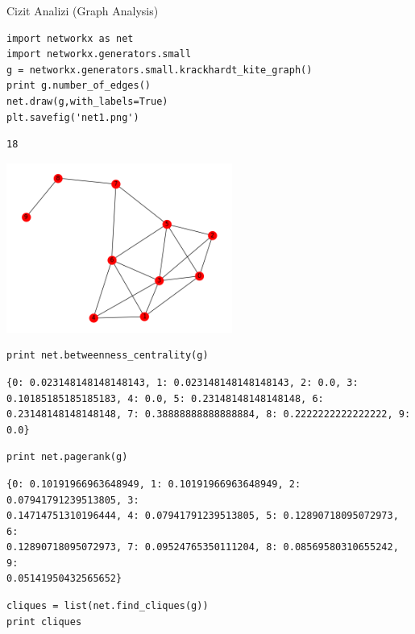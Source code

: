 \documentclass[12pt,fleqn]{article}\usepackage{../../common}
\begin{document}
Cizit Analizi (Graph Analysis)


\begin{verbatim}
import networkx as net
import networkx.generators.small
g = networkx.generators.small.krackhardt_kite_graph()
print g.number_of_edges()
net.draw(g,with_labels=True)
plt.savefig('net1.png')
\end{verbatim}

\begin{verbatim}
18
\end{verbatim}

\includegraphics[width=20em]{net1.png}

\begin{verbatim}
print net.betweenness_centrality(g)
\end{verbatim}

\begin{verbatim}
{0: 0.023148148148148143, 1: 0.023148148148148143, 2: 0.0, 3:
0.10185185185185183, 4: 0.0, 5: 0.23148148148148148, 6:
0.23148148148148148, 7: 0.38888888888888884, 8: 0.2222222222222222, 9: 0.0} 
\end{verbatim}

\begin{verbatim}
print net.pagerank(g)
\end{verbatim}

\begin{verbatim}
{0: 0.10191966963648949, 1: 0.10191966963648949, 2: 0.07941791239513805, 3:
0.14714751310196444, 4: 0.07941791239513805, 5: 0.12890718095072973, 6:
0.12890718095072973, 7: 0.09524765350111204, 8: 0.08569580310655242, 9:
0.05141950432565652} 
\end{verbatim}


\begin{verbatim}
cliques = list(net.find_cliques(g))
print cliques
\end{verbatim}
\end{document}

